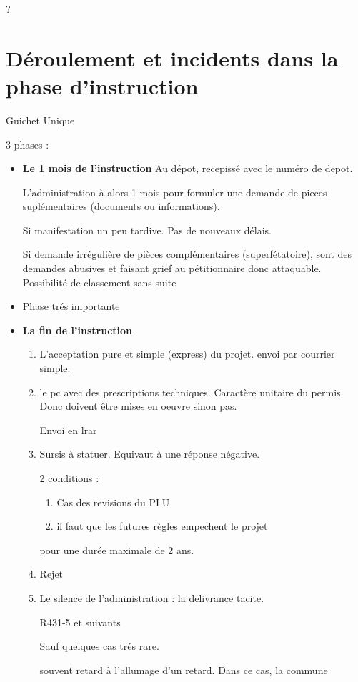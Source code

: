 	 ?



\section{Déroulement et incidents dans la phase d'instruction}

	Guichet Unique

	3 phases :
	\begin{itemize}
		\item \textbf{Le 1\ier{} mois de l'instruction} Au dépot, recepissé avec le numéro de depot.

		L'administration à alors 1 mois pour formuler une demande de pieces suplémentaires (documents ou informations).

		Si manifestation un peu tardive. Pas de nouveaux délais.

		Si demande irrégulière de pièces complémentaires (superfétatoire), sont des demandes abusives et faisant grief au pétitionnaire donc attaquable. Possibilité de classement sans suite

		\item \textbf{}

		Phase trés importante

		\item \textbf{La fin de l'instruction}
			\begin{enumerate}
				\item L'acceptation pure et simple (express) du projet. envoi par courrier simple.
				\item le pc avec des prescriptions techniques. Caractère unitaire du permis. Donc doivent être mises en oeuvre sinon pas.

				Envoi en lrar

				\item Sursis à statuer. Equivaut à une réponse négative.

				2 conditions :
				\begin{enumerate}
					\item Cas des revisions du PLU
					\item il faut que les futures règles empechent le projet
				\end{enumerate}

				pour une durée maximale de 2 ans.

				\item Rejet

				\item Le silence de l'administration : la delivrance tacite.

				R431-5 et suivants

				Sauf quelques cas trés rare.

				\medbreak souvent retard à l'allumage d'un retard. Dans ce cas, la commune
			\end{enumerate}
	\end{itemize}

